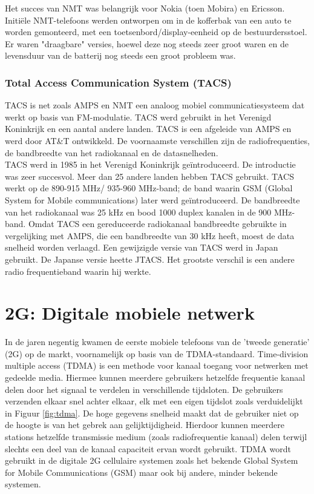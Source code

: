 \documentclass{article}
\begin{document}
\noindent Het succes van NMT was belangrijk voor Nokia (toen Mobira) \cite{nokia} en Ericsson. Initiële NMT-telefoons werden ontworpen om in de kofferbak van een auto te worden gemonteerd, met een toetsenbord/display-eenheid op de bestuurdersstoel. Er waren "draagbare" versies, hoewel deze nog steeds zeer groot waren en de levensduur van de batterij nog steeds een groot probleem was.

\subsubsection{Total Access Communication System (TACS)}
TACS is net zoals AMPS en NMT een analoog mobiel communicatiesysteem dat werkt op basis van FM-modulatie. TACS werd gebruikt in het Verenigd Koninkrijk en een aantal andere landen. TACS is een afgeleide van AMPS en werd door AT\&T ontwikkeld. De voornaamste verschillen zijn de radiofrequenties, de bandbreedte van het radiokanaal en de datasnelheden. \\

\noindent TACS werd in 1985 in het Verenigd Koninkrijk geïntroduceerd. De introductie was zeer succesvol. Meer dan 25 andere landen hebben TACS gebruikt. TACS werkt op de 890-915 MHz/ 935-960 MHz-band; de band waarin GSM (Global System for Mobile communications) later werd geïntroduceerd. De bandbreedte van het radiokanaal was 25 kHz en bood 1000 duplex kanalen in de 900 MHz-band. Omdat TACS een gereduceerde radiokanaal bandbreedte gebruikte in vergelijking met AMPS, die een bandbreedte van 30 kHz heeft, moest de data snelheid worden verlaagd. Een gewijzigde versie van TACS werd in Japan gebruikt. De Japanse versie heette JTACS. Het grootste verschil is een andere radio frequentieband waarin hij werkte. \cite{technieken}




\section{2G: Digitale mobiele netwerk}

In de jaren negentig kwamen de eerste mobiele telefoons van de 'tweede generatie' (2G) op de markt, voornamelijk op basis van de TDMA-standaard. Time-division multiple access (TDMA) is een methode voor kanaal toegang voor netwerken met gedeelde media. Hiermee kunnen meerdere gebruikers hetzelfde frequentie kanaal delen door het signaal te verdelen in verschillende tijdsloten. De gebruikers verzenden elkaar snel achter elkaar, elk met een eigen tijdslot zoals verduidelijkt in Figuur \ref{fig:tdma}. De hoge gegevens snelheid maakt dat de gebruiker niet op de hoogte is van het gebrek aan gelijktijdigheid. Hierdoor kunnen meerdere stations hetzelfde transmissie medium (zoals radiofrequentie kanaal) delen terwijl slechts een deel van de kanaal capaciteit ervan wordt gebruikt. TDMA wordt gebruikt in de digitale 2G cellulaire systemen zoals het bekende Global System for Mobile Communications (GSM) maar ook bij andere, minder bekende systemen. \cite{FDMA}
\end{document}

